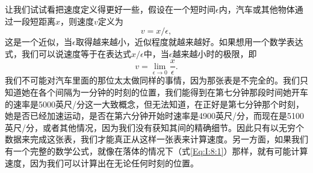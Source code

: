 让我们试试看把速度定义得更好一些，假设在一个短时间$\epsilon$内，汽车或其他物体通过一段短距离$x$，则速度$v$定义为
\begin{equation*}
v=x/\epsilon,
\end{equation*}
这是一个近似，当$\epsilon$取得越来越小，近似程度就越来越好。如果想用一个数学表达式，我们可以说速度等于在表达式$x/\epsilon$中，当$\epsilon$越来越小时的极限，即
\begin{equation}
\label{Eq:I:8:3}
v=\lim_{\epsilon\to0}\frac{x}{\epsilon}.
\end{equation}
我们不可能对汽车里面的那位太太做同样的事情，因为那张表是不完全的。我们只知道她在各个间隔为一分钟的时刻的位置，我们能得到在第七分钟那段时间她开车的速率是5000英尺/分这一大致概念，但无法知道，在正好是第七分钟那个时刻，她是否已经加速运动，是否在第六分钟开始时速率是4900英尺/分，而现在是5100英尺/分，或者其他情况，因为我们没有获知其间的精确细节。因此只有以无穷个数据来完成这张表，我们才能真正从这样一张表来计算速度。另一方面，如果我们有一个完整的数学公式，就像在落体的情况下（式\ref{Eq:I:8:1}）那样，就有可能计算速度，因为我们可以计算出在无论任何时刻的位置。

